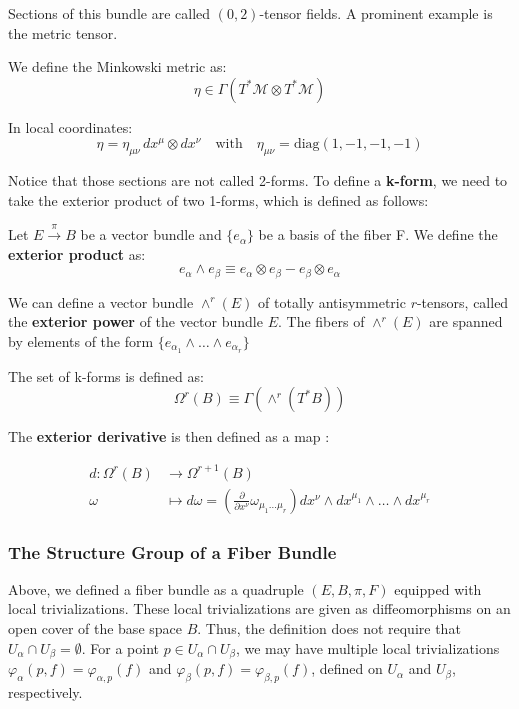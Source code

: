 Sections of this bundle are called \((0,2)\)-tensor fields. A prominent example is the metric tensor.

We define the Minkowski metric as:
\[
\eta \in \Gamma(T^*\mathcal{M} \otimes T^*\mathcal{M})
\]

In local coordinates:
\[
\eta = \eta_{\mu\nu} \, dx^\mu \otimes dx^\nu
\quad \text{with} \quad \eta_{\mu\nu} = \text{diag}(1, -1, -1, -1)
\]

Notice that those sections are not called 2-forms. To define a \textbf{k-form}, we need to take the exterior product of two 1-forms, which is defined as follows:

Let $E \xrightarrow{\pi} B$ be a vector bundle and $\{e_\alpha\}$ be a basis of the fiber F. We define the \textbf{exterior product} as:
\[e_\alpha \wedge e_\beta \equiv e_\alpha \otimes e_\beta - e_\beta \otimes e_\alpha\]


We can define a vector bundle \( \wedge^r (E) \) of totally antisymmetric \( r \)-tensors, called the \textbf{exterior power} of the vector bundle \( E \). The fibers of \( \wedge^r (E) \) are spanned by elements of the form $\{ e_{\alpha_1} \wedge \dots \wedge e_{\alpha_r} \}$
 
The set of k-forms is defined as:
\[\Omega^r(B) \equiv \Gamma(\wedge^r (T^*B))\]


The \textbf{exterior derivative} is then defined as a map \cite{NakaharaGeometrytopologyphysics2005}:

\begin{align*}
  d: \Omega^r(B) &\to \Omega^{r+1}(B) \\
  \omega &\mapsto d\omega = \left( \frac{\partial}{ \partial x^\nu} \omega_{\mu_1 \dots \mu_r} \right) dx^\nu \wedge dx^{\mu_1} \wedge \dots \wedge dx^{\mu_r}
\end{align*}





\subsubsection*{The Structure Group of a Fiber Bundle}

Above, we defined a fiber bundle as a quadruple $(E, B, \pi, F)$ equipped with local trivializations. These local trivializations are given as diffeomorphisms on an open cover of the base space $B$. Thus, the definition does not require that $U_\alpha \cap U_\beta = \emptyset$. For a point $p \in U_\alpha \cap U_\beta$, we may have multiple local trivializations $\varphi_\alpha(p, f) = \varphi_{\alpha,p}(f)$ and $\varphi_\beta(p, f) = \varphi_{\beta,p}(f)$, defined on $U_\alpha$ and $U_\beta$, respectively. 

